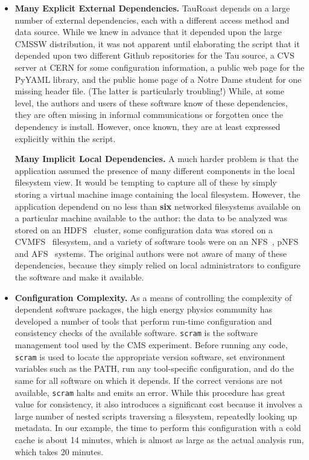 \documentclass{sig-alternate}
\begin{document}
\begin{itemize}

\item {\bf Many Explicit External Dependencies.}  TauRoast depends on a large number of
external dependencies, each with a different access method and data source.
While we knew in advance that it depended upon the large CMSSW distribution,
it was not apparent until elaborating the script that it depended upon
two different Github repositories for the Tau source,
a CVS server at CERN for some configuration information, a public web page
for the PyYAML library, and the public home page of a Notre Dame student
for one missing header file.  (The latter is particularly troubling!)
While, at some level, the authors and users of these software know of these dependencies, they are often missing in
informal communications or forgotten once the dependency is install.
However, once known, they are at least expressed explicitly within the script.

{\bf Many Implicit Local Dependencies.} A much harder problem is that the
application assumed the presence of many different components in the local
filesystem view.  It would be tempting to capture all of these by simply
storing a virtual machine image containing the local filesystem.  However,
the application dependend on no less than {\bf six} networked filesystems
available on a particular machine available to the author:
the data to be analyzed was stored on an HDFS~\cite{hadoop} cluster,
some configuration data was stored on a CVMFS~\cite{cvmfs} filesystem,
and a variety of software tools were on an NFS~\cite{howard1988scale},
pNFS~\cite{welch2008scalable} and AFS~\cite{sandberg1985design} systems.
The original authors were not aware of many of these dependencies,
because they simply relied on local administrators to configure the
software and make it available.

\item {\bf Configuration Complexity.}  As a means of controlling the complexity
of dependent software packages, the high energy physics community has developed
a number of tools that perform run-time configuration and consistency checks
of the available software.  {\tt scram} is the software management tool used
by the CMS experiment.  Before running any code, {\tt scram} is used to locate
the appropriate version software,  set environment variables such as the PATH, run any
tool-specific configuration, and do the same for all software on which it depends.
If the correct versions are not available, {\tt scram} halts and emits an error.
While this procedure has great value for consistency, it also introduces a significant cost
because it involves a large number of nested scripts traversing a filesystem,
repeatedly looking up metadata.  In our example, the time to perform this configuration
with a cold cache is about 14 minutes, which is almost as large as the actual analysis
run, which takes 20 minutes.


\end{itemize}
\end{document}
